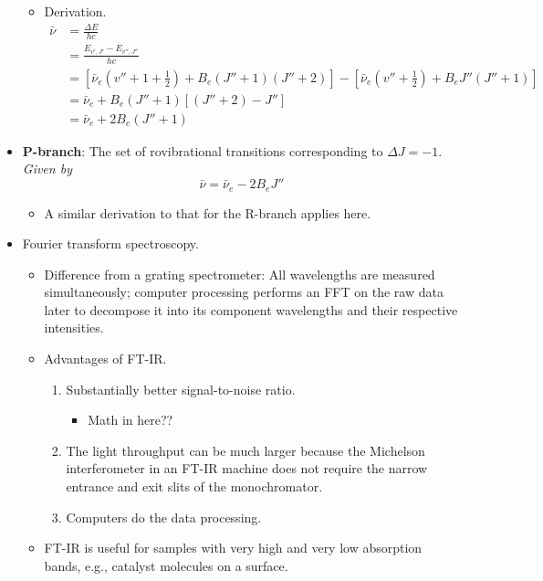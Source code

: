 \documentclass[../notes.tex]{subfiles}
\begin{document}
\begin{itemize}
\begin{equation*}
    \end{equation*}
    \begin{itemize}
        \item Derivation.
        \begin{align*}
            \bar{\nu} &= \frac{\Delta E}{hc}\\
            &= \frac{E_{v',J'}-E_{v'',J''}}{hc}\\
            &= \left[ \bar{\nu}_e\left( v''+1+\frac{1}{2} \right)+B_e(J''+1)(J''+2) \right]-\left[ \bar{\nu}_e\left( v''+\frac{1}{2} \right)+B_eJ''(J''+1) \right]\\
            &= \bar{\nu}_e+B_e(J''+1)[(J''+2)-J'']\\
            &= \bar{\nu}_e+2B_e(J''+1)
        \end{align*}
    \end{itemize}
    \item \textbf{P-branch}: The set of rovibrational transitions corresponding to $\Delta J=-1$. \emph{Given by}
    \begin{equation*}
        \bar{\nu} = \bar{\nu}_e-2B_eJ''
    \end{equation*}
    \begin{itemize}
        \item A similar derivation to that for the R-branch applies here.
    \end{itemize}
    \item Fourier transform spectroscopy.
    \begin{itemize}
        \item Difference from a grating spectrometer: All wavelengths are measured simultaneously; computer processing performs an FFT on the raw data later to decompose it into its component wavelengths and their respective intensities.
        \item Advantages of FT-IR.
        \begin{enumerate}
            \item Substantially better signal-to-noise ratio.
            \begin{itemize}
                \item Math in here??
            \end{itemize}
            \item The light throughput can be much larger because the Michelson interferometer in an FT-IR machine does not require the narrow entrance and exit slits of the monochromator.
            \item Computers do the data processing.
        \end{enumerate}
        \item FT-IR is useful for samples with very high and very low absorption bands, e.g., catalyst molecules on a surface.
    \end{itemize}
\end{itemize}
\end{document}
